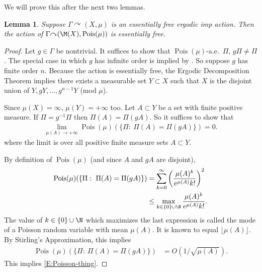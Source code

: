 \documentclass[12pt]{article}
\theoremstyle{plain}
\newtheorem{lem}[thm]{Lemma}
\theoremstyle{definition}
\theoremstyle{remark}
\newcommand{\G}{\Gamma}
\newcommand\Pois{\operatorname{Pois}}
\def\cc{{\curvearrowright}}
\begin{document}
We will prove this after the next two lemmas.

\begin{lem}\label{L:cost-ess-free}
    Suppose $\G \cc (X,\mu)$ is an essentially free ergodic imp action. Then the action of $\G \cc (\M(X),\Pois(\mu))$ is essentially free.
\end{lem}

\begin{proof}
    Let $g\in \G$ be nontrivial. It suffices to show that $\Pois(\mu)$-a.e.\ $\Pi$, $g\Pi \ne \Pi$. The special case in which $g$ has infinite order is implied by \cite[Theorem 4.8]{MR2308588}. So suppose $g$ has finite order $n$. Because the action is essentially free, the Ergodic Decomposition Theorem implies there exists a measurable set $Y \subset X$ such that $X$ is the disjoint union of $Y,gY,\ldots, g^{n-1}Y$ (mod $\mu$). 
    

Since $\mu(X)=\infty$, $\mu(Y)=+\infty$ too. Let $A \subset Y$ be a set with finite positive measure. If $\Pi = g^{-1}\Pi$ then $\Pi(A) = \Pi(gA)$. So   it suffices to show that 
    \begin{align}\label{E:Poisson-thing}
        \lim_{\mu(A)\to +\infty} \Pois(\mu)(\{\Pi:~ \Pi(A) = \Pi(gA)\}) = 0.
    \end{align}
where the limit is over all positive finite measure sets $A \subset Y$. 

By definition of $\Pois(\mu)$ (and since $A$ and $gA$ are disjoint),
\begin{align*}
    \Pois(\mu)(\{\Pi:~ \Pi(A) = \Pi(gA)\}) &=\sum_{k=0}^\infty  \left(\frac{\mu(A)^k}{e^{\mu(A)}k!}\right)^2 \\
    &\le \max_{k \in \{0\} \cup \N} \frac{\mu(A)^k}{e^{\mu(A)}k!}.
\end{align*}
The value of $k \in \{0\} \cup \N$ which maximizes the last expression is called the mode of a Poisson random variable with mean $\mu(A)$. It is known to equal $\lfloor \mu(A) \rfloor$. By Stirling's Approximation, this implies 
\begin{align*}
     \Pois(\mu)(\{\Pi:~ \Pi(A) = \Pi(gA)\})   &=O(1/\sqrt{\mu(A)}). 
\end{align*}
This implies \eqref{E:Poisson-thing}.


    
\end{proof}
\end{document}
